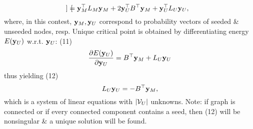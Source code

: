 \documentclass{article}
\begin{document}
\begin{itemize}
\begin{itemize}
\begin{equation*}
\begin{bmatrix}
            \end{bmatrix} = {\bf y}_M^\top L_M{\bf y}_M + 2{\bf y}_U^\top B^\top{\bf y}_M + {\bf y}_U^\top L_U{\bf y}_U,
        \end{equation*}
        where, in this contest, ${\bf y}_M,{\bf y}_U$ correspond to probability vectors of seeded \& unseeded nodes, resp. Unique critical point is obtained by differentiating energy $E({\bf y}_U)$ w.r.t. ${\bf y}_U$: (11)
        \begin{equation*}
            \frac{\partial E({\bf y}_U)}{\partial{\bf y}_U} = B^\top{\bf y}_M + L_U{\bf y}_U
        \end{equation*}
        thus yielding (12)
        \begin{equation*}
            L_U{\bf y}_U =  -B^\top{\bf y}_M,
        \end{equation*}
        which is a system of linear equations with $|{\cal V}_U|$ unknowns. Note: if graph is connected or if every connected component contains a seed, then (12) will be nonsingular \& a unique solution will be found.
        

\end{itemize}
\end{itemize}
\end{document}
